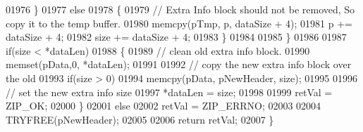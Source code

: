 \begin{DoxyCode}
01976     \}
01977     \textcolor{keywordflow}{else}
01978     \{
01979       \textcolor{comment}{// Extra Info block should not be removed, So copy it to the temp buffer.}
01980       memcpy(pTmp, p, dataSize + 4);
01981       p += dataSize + 4;
01982       size += dataSize + 4;
01983     \}
01984 
01985   \}
01986 
01987   \textcolor{keywordflow}{if}(size < *dataLen)
01988   \{
01989     \textcolor{comment}{// clean old extra info block.}
01990     memset(pData,0, *dataLen);
01991 
01992     \textcolor{comment}{// copy the new extra info block over the old}
01993     \textcolor{keywordflow}{if}(size > 0)
01994       memcpy(pData, pNewHeader, size);
01995 
01996     \textcolor{comment}{// set the new extra info size}
01997     *dataLen = size;
01998 
01999     retVal = ZIP\_OK;
02000   \}
02001   \textcolor{keywordflow}{else}
02002     retVal = ZIP\_ERRNO;
02003 
02004   TRYFREE(pNewHeader);
02005 
02006   \textcolor{keywordflow}{return} retVal;
02007 \}
\end{DoxyCode}
